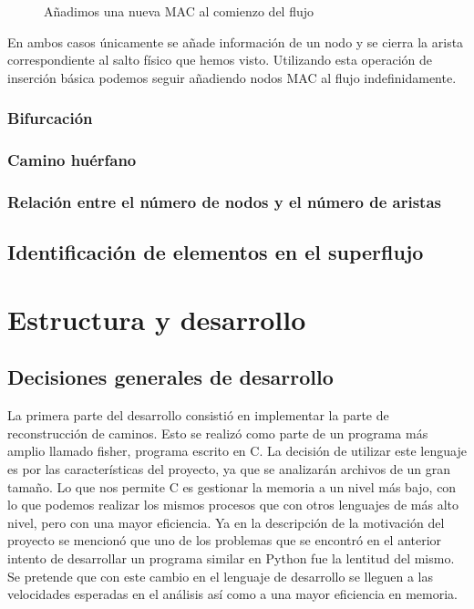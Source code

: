 \documentclass[twoside, 12pt]{epstfg}
\begin{document}
\begin{figure}
\centering

\caption[Resultado de añadir MAC0 al comienzo del flujo]{Añadimos una nueva MAC al comienzo del flujo}
\label{fig:Analisis:AddingFirst}
\end{figure}

En ambos casos únicamente se añade información de un nodo y se cierra la arista correspondiente al salto físico que hemos visto. Utilizando esta operación de inserción básica podemos seguir añadiendo nodos MAC al flujo indefinidamente.

\subsection{Bifurcación}

\subsection{Camino huérfano}

\subsection{Relación entre el número de nodos y el número de aristas}

\section{Identificación de elementos en el superflujo}

\chapter{Estructura y desarrollo}
\label{chap:Desarrollo}
\section{Decisiones generales de desarrollo}
La primera parte del desarrollo consistió en implementar la parte de reconstrucción de caminos. Esto se realizó como parte de un programa más amplio llamado fisher, programa escrito en C. La decisión de utilizar este lenguaje es por las características del proyecto, ya que se analizarán archivos de un gran tamaño. Lo que nos permite C es gestionar la memoria a un nivel más bajo, con lo que podemos realizar los mismos procesos que con otros lenguajes de más alto nivel, pero con una mayor eficiencia. Ya en la descripción de la motivación del proyecto se mencionó que uno de los problemas que se encontró en el anterior intento de desarrollar un programa similar en Python fue la lentitud del mismo. Se pretende que con este cambio en el lenguaje de desarrollo se lleguen a las velocidades esperadas en el análisis así como a una mayor eficiencia en memoria.
\end{document}
